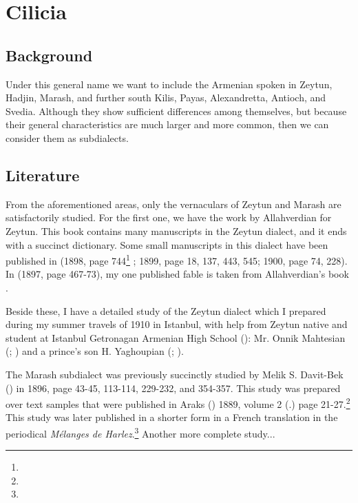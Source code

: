 \chapter{Cilicia}\label{chapter:Cilicia}
\section{Background}
\begin{adjarianpage}\label{page:199}\end{adjarianpage}%

Under this general name we want to include the Armenian spoken in Zeytun, Hadjin, Marash, and further south Kilis, Payas, Alexandretta, Antioch, and Svedia. Although they show sufficient differences among themselves, but because their general characteristics are much larger and more common, then we can consider them as subdialects. 

\section{Literature}
From the aforementioned areas, only the vernaculars of Zeytun and Marash are satisfactorily studied. For the first one, we have the work by Allahverdian \citep{Allahverdian-1884-UlniaZeytun} for Zeytun. This book contains many manuscripts in the Zeytun dialect, and it ends with a succinct dictionary. Some small manuscripts in this dialect have been published in  (1898, page 744\footnote{} ; 1899, page 18, 137, 443, 545; 1900, page 74, 228). In  (1897, page 467-73), my one published fable is taken from Allahverdian's book \citep{Allahverdian-1884-UlniaZeytun}.


Beside these, I have a detailed study of the Zeytun dialect which I prepared during my summer travels of 1910 in Istanbul, with help from Zeytun native and student at Istanbul Getronagan Armenian High School (): Mr. Onnik Mahtesian (; ) and a prince's son H. Yaghoupian (; ). 




The Marash subdialect was previously succinctly studied by Melik S. Davit-Bek () in  1896, page 43-45, 113-114, 229-232, and 354-357. This study was prepared over text samples that were published in Araks () 1889, volume 2 (.) page 21-27.\footnote{} This study was later published in a shorter form in a French translation in the periodical \textit{Mélanges de Harlez}.\footnote{} Another more complete study... 


